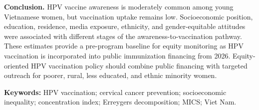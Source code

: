 \textbf{Conclusion.} HPV vaccine awareness is moderately common among young Vietnamese women, but vaccination uptake remains low. Socioeconomic position, education, residence, media exposure, ethnicity, and gender-equitable attitudes were associated with different stages of the awareness-to-vaccination pathway. These estimates provide a pre-program baseline for equity monitoring as HPV vaccination is incorporated into public immunization financing from 2026. Equity-oriented HPV vaccination policy should combine public financing with targeted outreach for poorer, rural, less educated, and ethnic minority women.

\textbf{Keywords:} HPV vaccination; cervical cancer prevention; socioeconomic inequality; concentration index; Erreygers decomposition; MICS; Viet Nam.
\clearpage
